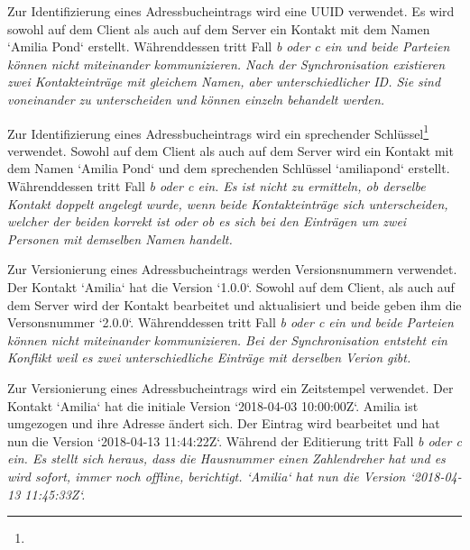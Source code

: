 \begin{description}[leftmargin=0.5cm,style=nextline]
  \item[Methode ID0 -- UUID:]
    Zur Identifizierung eines Adressbucheintrags wird eine \gls{UUID} verwendet. Es wird sowohl auf dem Client als auch auf dem Server ein Kontakt mit dem Namen `Amilia Pond` erstellt.
    Währenddessen tritt Fall \it{b} oder \it{c} ein und beide Parteien können nicht miteinander kommunizieren. Nach der Synchronisation existieren zwei Kontakteinträge mit gleichem Namen, aber unterschiedlicher ID.
    Sie sind voneinander zu unterscheiden und können einzeln behandelt werden.\\
%
  \item[Methode ID1 -- sprechender Schlüssel:]
    Zur Identifizierung eines Adressbucheintrags wird ein sprechender Schlüssel\footnote{\naturalkey} verwendet.
    Sowohl auf dem Client als auch auf dem Server wird ein Kontakt mit dem Namen `Amilia Pond` und dem sprechenden Schlüssel `amiliapond` erstellt.
    Währenddessen tritt Fall \it{b} oder \it{c} ein.
    Es ist nicht zu ermitteln, ob derselbe Kontakt doppelt angelegt wurde, wenn beide Kontakteinträge sich unterscheiden, welcher der beiden korrekt ist oder ob es sich bei den Einträgen um zwei Personen mit demselben Namen handelt.\\
  \item[Methode V0 -- Versionsnummer:]
    Zur Versionierung eines Adressbucheintrags werden Versionsnummern verwendet. Der Kontakt `Amilia` hat die Version `1.0.0`.
    Sowohl auf dem Client, als auch auf dem Server wird der Kontakt bearbeitet und aktualisiert und beide geben ihm die Versonsnummer `2.0.0`.
    Währenddessen tritt Fall \it{b} oder \it{c} ein und beide Parteien können nicht miteinander kommunizieren.
    Bei der Synchronisation entsteht ein Konflikt weil es zwei unterschiedliche Einträge mit derselben Verion gibt.\\
  \item[Methode V1 -- Zeitstempel:]
    Zur Versionierung eines Adressbucheintrags wird ein Zeitstempel verwendet. Der Kontakt `Amilia` hat die initiale Version `2018-04-03 10:00:00Z`.
    Amilia ist umgezogen und ihre Adresse ändert sich. Der Eintrag wird bearbeitet und hat nun die Version `2018-04-13 11:44:22Z`.
    Während der Editierung tritt Fall \it{b} oder \it{c} ein.
    Es stellt sich heraus, dass die Hausnummer einen Zahlendreher hat und es wird sofort, immer noch offline, berichtigt. `Amilia` hat nun die Version `2018-04-13 11:45:33Z`.\\

\end{description}
